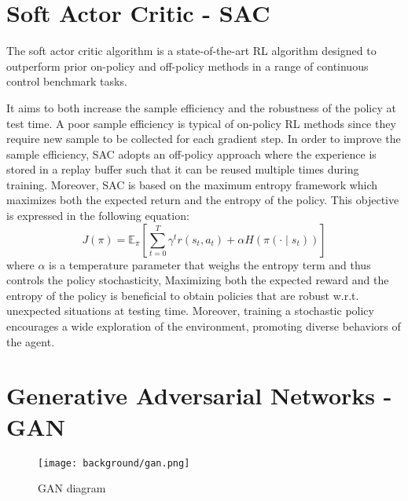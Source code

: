 \section{Soft Actor Critic - SAC}
The soft actor critic algorithm \citep{art:sac} is a state-of-the-art RL algorithm designed to outperform prior on-policy and off-policy methods in a range of continuous control benchmark tasks. 

It aims to both increase the sample efficiency and the robustness of the policy at test time. A poor sample efficiency is typical of on-policy RL methods since they require new sample to be collected for each gradient step. In order to improve the sample efficiency, SAC adopts an off-policy approach where the experience is stored in a replay buffer such that it can be reused multiple times during training. Moreover, SAC is based on the maximum entropy framework which maximizes both the expected return and the entropy of the policy. This objective is expressed in the following equation:
\begin{equation}
  J(\pi)=\mathbb{E}_{\pi}[\sum _{t=0}^{T}\gamma ^{t}r(s_{t},a_{t})+\alpha H(\pi(\cdot \mid s_{t}))]
\end{equation}
where $\alpha$ is a temperature parameter that weighs the entropy term and thus controls the policy stochasticity, Maximizing both the expected reward and the entropy of the policy is beneficial to obtain policies that are robust w.r.t. unexpected situations at testing time. Moreover, training a stochastic policy encourages a wide exploration of the environment, promoting diverse behaviors of the agent.

\section{Generative Adversarial Networks - GAN}
\begin{wrapfigure}{r}{0.6\textwidth}
  \begin{center}
    \texttt{[image: background/gan.png]}
  \end{center}
  \caption{GAN diagram}
  \label{fig:gan}
\end{wrapfigure}

